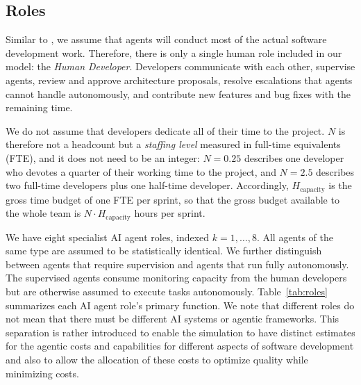 \documentclass[smallextended]{svjour3}       %
\begin{document}
\subsection{Roles}
\label{sec:model:roles}

Similar to \cite{hassan2026ainative}, we assume that agents will conduct most of the actual software development work. Therefore, there is only a single human role included in our model: the \textit{Human
Developer}. Developers communicate with each other, supervise agents,
review and approve architecture proposals, resolve
escalations that agents cannot handle autonomously, and contribute new
features and bug fixes with the remaining time.

We do not assume that developers dedicate all of their time to the project. $N$ is therefore
not a headcount but a \emph{staffing level} measured in full-time equivalents (FTE), and it does
not need to be an integer: $N = 0.25$ describes one developer who devotes a quarter of their
working time to the project, and $N = 2.5$ describes two full-time developers plus one
half-time developer. Accordingly, $H_\mathrm{capacity}$ is the gross time budget of one FTE
per sprint, so that the gross budget available to the whole team is $N \cdot
H_\mathrm{capacity}$ hours per sprint.

We have eight specialist AI agent roles, indexed $k = 1,\ldots,8$. All agents of the
same type are assumed to be statistically identical. We further distinguish between agents that
require supervision and agents that run fully autonomously. The supervised agents consume monitoring capacity from
the human developers but are otherwise assumed to execute tasks autonomously. Table~\ref{tab:roles} summarizes each AI agent role's primary function. We note that different roles do not mean that there must be different AI systems or agentic frameworks. This separation is rather introduced to enable the simulation to have distinct estimates for the agentic costs and capabilities for different aspects of software development and also to allow the allocation of these costs to optimize quality while minimizing costs. 
\end{document}
